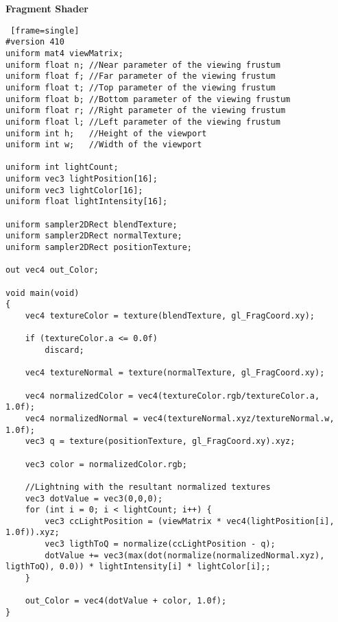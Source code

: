 \textbf{Fragment Shader}
\begin{lstlisting} [frame=single]
#version 410
uniform mat4 viewMatrix;
uniform float n; //Near parameter of the viewing frustum
uniform float f; //Far parameter of the viewing frustum
uniform float t; //Top parameter of the viewing frustum
uniform float b; //Bottom parameter of the viewing frustum
uniform float r; //Right parameter of the viewing frustum
uniform float l; //Left parameter of the viewing frustum
uniform int h; 	 //Height of the viewport
uniform int w; 	 //Width of the viewport

uniform int lightCount;
uniform vec3 lightPosition[16];
uniform vec3 lightColor[16];
uniform float lightIntensity[16];

uniform sampler2DRect blendTexture;
uniform sampler2DRect normalTexture;
uniform sampler2DRect positionTexture;

out vec4 out_Color;

void main(void)
{
	vec4 textureColor = texture(blendTexture, gl_FragCoord.xy);

	if (textureColor.a <= 0.0f)
		discard;

	vec4 textureNormal = texture(normalTexture, gl_FragCoord.xy);

	vec4 normalizedColor = vec4(textureColor.rgb/textureColor.a, 1.0f);
	vec4 normalizedNormal = vec4(textureNormal.xyz/textureNormal.w, 1.0f);
	vec3 q = texture(positionTexture, gl_FragCoord.xy).xyz;

	vec3 color = normalizedColor.rgb;

	//Lightning with the resultant normalized textures
	vec3 dotValue = vec3(0,0,0);
	for (int i = 0; i < lightCount; i++) {
		vec3 ccLightPosition = (viewMatrix * vec4(lightPosition[i], 1.0f)).xyz;
		vec3 ligthToQ = normalize(ccLightPosition - q);
		dotValue += vec3(max(dot(normalize(normalizedNormal.xyz), ligthToQ), 0.0)) * lightIntensity[i] * lightColor[i];;
	}

	out_Color = vec4(dotValue + color, 1.0f);
}
\end{lstlisting}